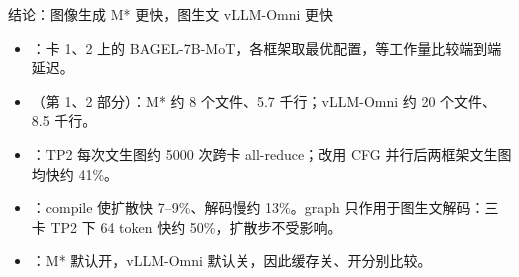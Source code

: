 
\begin{frame}[t]{结论：图像生成 M* 更快，图生文 vLLM-Omni 更快}
\small
\begin{itemize}\setlength\itemsep{2pt}
  \item {}：卡 1、2 上的 BAGEL-7B-MoT，各框架取最优配置，等工作量比较端到端延迟。
  \item {}（第 1、2 部分）：M* 约 8 个文件、5.7 千行；vLLM-Omni 约 20 个文件、8.5 千行。
  \item {}：TP2 每次文生图约 5000 次跨卡 all-reduce；改用 CFG 并行后两框架文生图均快约 41\%。
  \item {}：compile 使扩散快 7--9\%、解码慢约 13\%。graph 只作用于图生文解码：三卡 TP2 下 64 token 快约 50\%，扩散步不受影响。
  \item {}：M* 默认开，vLLM-Omni 默认关，因此缓存关、开分别比较。
\end{itemize}
\end{frame}

